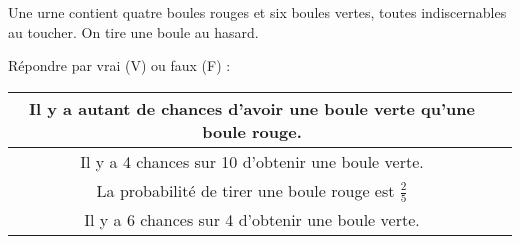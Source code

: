 
Une urne contient quatre boules rouges et six boules vertes, toutes indiscernables au
toucher. On tire une boule au hasard.

Répondre par vrai (V) ou faux (F) :
 
\begin{tabular}{|c|c|}
\hline 
Il y a autant de chances d'avoir une boule verte qu'une boule rouge. &  \\ 
\hline 
Il y a 4 chances sur 10 d'obtenir une boule verte. & \\ 
\hline 
La probabilité de tirer une boule rouge est $\frac{2}{5}$ &  \\ 
\hline 
Il y a 6 chances sur 4 d'obtenir une boule verte. & \\ 
\hline 
\end{tabular} 